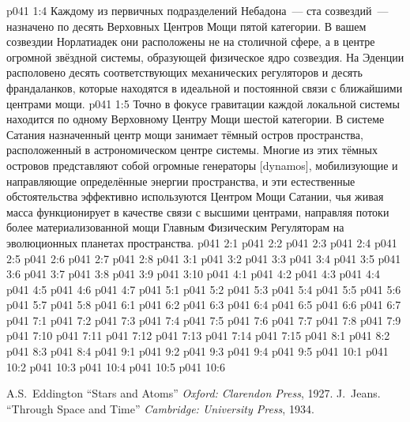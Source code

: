 \vs p041 1:4 Каждому из первичных подразделений Небадона~--- ста созвездий~--- назначено по десять Верховных Центров Мощи пятой категории. В вашем созвездии Норлатиадек они расположены не на столичной сфере, а в центре огромной звёздной системы, образующей физическое ядро созвездия. На Эденции располовено десять соответствующих механических регуляторов и десять франдаланков, которые находятся в идеальной и постоянной связи с ближайшими центрами мощи.
\vs p041 1:5 Точно в фокусе гравитации каждой локальной системы находится по одному Верховному Центру Мощи шестой категории. В системе Сатания назначенный центр мощи занимает тёмный остров пространства, расположенный в астрономическом центре системы. Многие из этих тёмных островов представляют собой огромные генераторы [dynamos], мобилизующие и направляющие определённые энергии пространства, и эти естественные обстоятельства эффективно используются Центром Мощи Сатании, чья живая масса функционирует в качестве связи с высшими центрами, направляя потоки более материализованной мощи Главным Физическим Регуляторам на эволюционных планетах пространства.
\vs p041 2:1 
\vs p041 2:2 
\vs p041 2:3 \pc 
\vs p041 2:4 
\vs p041 2:5 
\vs p041 2:6 \pc 
\vs p041 2:7 \pc 
\vs p041 2:8 
\vs p041 3:1 
\vs p041 3:2 
\vs p041 3:3 \pc 
\vs p041 3:4 
\vs p041 3:5 \pc 
\vs p041 3:6 \pc 
\vs p041 3:7 
\vs p041 3:8 \pc 
\vs p041 3:9 
\vs p041 3:10 
\vs p041 4:1 
\vs p041 4:2 \pc 
\vs p041 4:3 \pc 
\vs p041 4:4 
\vs p041 4:5 
\vs p041 4:6 
\vs p041 4:7 
\vs p041 5:1 
\vs p041 5:2 
\vs p041 5:3 
\vs p041 5:4 
\vs p041 5:5 
\vs p041 5:6 \pc 
\vs p041 5:7 \pc 
\vs p041 5:8 
\vs p041 6:1 
\vs p041 6:2 
\vs p041 6:3 \pc 
\vs p041 6:4 
\vs p041 6:5 
\vs p041 6:6 \pc 
\vs p041 6:7 \pc 
{}
\vs p041 7:1 
\vs p041 7:2 
\vs p041 7:3 \pc 
\vs p041 7:4 
\vs p041 7:5 
\vs p041 7:6 
\vs p041 7:7 
\vs p041 7:8 
\vs p041 7:9 
\vs p041 7:10 
\vs p041 7:11 \pc 
\vs p041 7:12 \pc 
\vs p041 7:13 
\vs p041 7:14 \pc 
\vs p041 7:15 
\vs p041 8:1 
\vs p041 8:2 \pc 
\vs p041 8:3 \pc 
\vs p041 8:4 
\vs p041 9:1 
\vs p041 9:2 \pc 
\vs p041 9:3 \pc 
\vs p041 9:4 
\vs p041 9:5 
\vs p041 10:1 
\vs p041 10:2 
\vs p041 10:3 \pc 
\vs p041 10:4 
\vs p041 10:5 \pc 
\vsetoff
\vs p041 10:6 
\quizlink
\begin{thebibliography}{100}
A.S.~Eddington
{``Stars and Atoms''}
{\em Oxford: Clarendon Press}, 1927.
J.~Jeans.
{``Through Space and Time''}
{\em Cambridge: University Press}, 1934.
\end{thebibliography}
